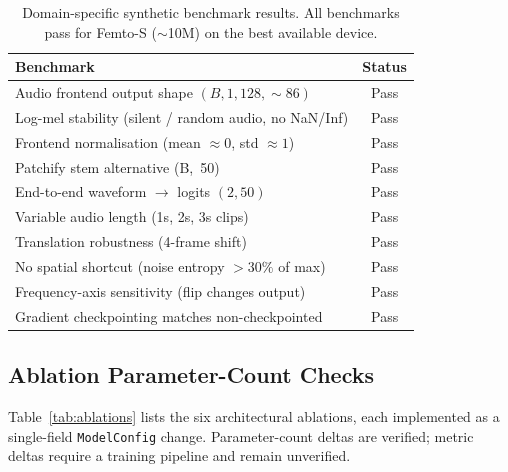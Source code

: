 \documentclass{article}
\newcommand{\passmark}{\textnormal{Pass}}
\begin{document}
\begin{table}[h]
  \centering
  \caption{Domain-specific synthetic benchmark results. All benchmarks
  pass for Femto-S ($\sim$10M) on the best available device.}
  \label{tab:synth}
  \small
  \begin{tabular}{lc}
  \toprule
  \textbf{Benchmark} & \textbf{Status} \\
  \midrule
  Audio frontend output shape $(B, 1, 128, \sim86)$ & \passmark \\
  Log-mel stability (silent / random audio, no NaN/Inf) & \passmark \\
  Frontend normalisation (mean $\approx 0$, std $\approx 1$) & \passmark \\
  Patchify stem alternative (B,~50) & \passmark \\
  End-to-end waveform $\rightarrow$ logits $(2, 50)$ & \passmark \\
  Variable audio length (1s, 2s, 3s clips) & \passmark \\
  Translation robustness (4-frame shift) & \passmark \\
  No spatial shortcut (noise entropy $> 30\%$ of max) & \passmark \\
  Frequency-axis sensitivity (flip changes output) & \passmark \\
  Gradient checkpointing matches non-checkpointed & \passmark \\
  \bottomrule
  \end{tabular}
\end{table}


\subsection{Ablation Parameter-Count Checks}

Table~\ref{tab:ablations} lists the six architectural ablations, each
implemented as a single-field \texttt{ModelConfig} change. Parameter-count
deltas are verified; metric deltas require a training pipeline and remain
unverified.
\end{document}
